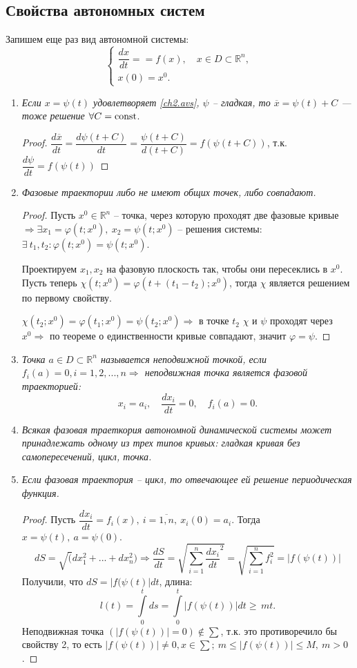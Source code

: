 \subsection{Свойства автономных систем}
Запишем еще раз вид автономной системы:
\begin{equation}\label{ch2.avs}
\begin{cases}
\dfrac{dx}{dt}==f(x),\quad x\in D\subset\mathbb{R}^n,\\
x(0)=x^0.
\end{cases}
\end{equation}
\begin{enumerate}
\item \textit{Если $x=\psi(t)$ удовлетворяет \ref{ch2.avs}, $\psi$ -- гладкая, то $\overline{x}=\psi(t)+C$ --- тоже решение $\forall C=\operatorname{const}$}. 
\begin{proof}
$\dfrac{d\overline{x}}{dt}=\dfrac{d\psi(t+C)}{dt}=\dfrac{\psi(t+C)}{d(t+C)}=f(\psi(t+C))$, т.к. $\dfrac{d\psi}{dt}=f(\psi(t))$
\end{proof}
\item  \textit{Фазовые траектории либо не имеют общих точек, либо совпадают.}
\begin{proof}
Пусть $x^0\in\mathbb{R}^n$ -- точка, через которую проходят две фазовые кривые $\Rightarrow \exists x_1=\varphi(t;x^0),\ x_2=\psi(t;x^0)$ -- решения системы: $\exists\: t_1,t_2:\varphi(t;x^0)=\psi(t;x^0)$.

Проектируем $x_1,x_2$ на фазовую плоскость так, чтобы они пересеклись в $x^0$. Пусть теперь $\chi(t;x^0)=\varphi(t+(t_1-t_2);x^0)$, тогда $\chi$ является решением по первому свойству.

$\chi(t_2;x^0)=\varphi(t_1;x^0)=\psi(t_2;x^0)\Rightarrow$ в точке $t_2$ 
$\chi$ и $\psi$ проходят через $x^0\Rightarrow$ по теореме о единственности кривые совпадают, значит $\varphi=\psi$.  
\end{proof}
\item \textit{Точка $a\in D\subset\mathbb{R}^n$ называется неподвижной точкой, если $f_i(a)=0,i=1,2,...,n \Rightarrow$ неподвижная точка является фазовой траекторией:}
$$
x_i=a_i,\quad \dfrac{dx_i}{dt}=0,\quad f_i(a)=0.
$$
\item \textit{Всякая фазовая траеткория автономной динамической системы может принадлежать одному из трех типов кривых: гладкая кривая без самопересечений, цикл, точка.}
\item \textit{Если фазовая траектория -- цикл, то отвечающее ей решение периодическая функция.}
\begin{proof}
Пусть $\dfrac{dx_i}{dt}=f_i(x),\ i=\overline{1,n},\ x_i(0)=a_i$. Тогда $x=\psi(t),\ a=\psi(0)$. 
$$
dS=\sqrt(dx_1^2+...+dx_n^2) \Rightarrow \dfrac{dS}{dt}=\sqrt{\sum\limits_{i=1}^{n}\dfrac{dx_i}{dt}^2}=\sqrt{\sum\limits_{i=1}^{n}f_i^2}=|f(\psi(t))|
$$
Получили, что $dS=|f(\psi(t)|dt$, длина:
$$
l(t)=\int\limits_{0}^{t}ds=\int\limits_{0}^{t}|f(\psi(t))|dt\geqslant\,mt.
$$ 
Неподвижная точка $(|f(\psi(t))|=0)\notin\sum$, т.к. это противоречило бы свойству 2, то есть $|f(\psi(t))| \neq 0, x\in\sum;\ m\leqslant|f(\psi(t))|\leqslant M,\ m > 0$. 


\end{proof}
\end{enumerate}
